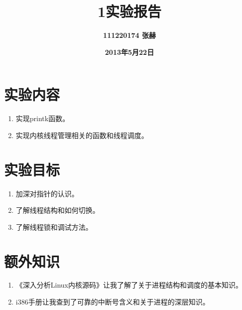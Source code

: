 \documentclass[11pt]{article}
\begin{document}
\title{1实验报告\rm}
\author{\bf111220174 张赫\rm}
\date{\bf 2013年5月22日 \rm}

\maketitle


\section{实验内容}
\begin{enumerate}
  \item 实现printk函数。
 \item 实现内核线程管理相关的函数和线程调度。
\end{enumerate}


\section{实验目标}
\begin{enumerate}
  \item 加深对指针的认识。
  
  \item 了解线程结构和如何切换。
  
  \item 了解线程锁和调试方法。
\end{enumerate}

\section{额外知识}
\begin{enumerate}
 \item 
  《深入分析Linux内核源码》让我了解了关于进程结构和调度的基本知识。
 \item
  i386手册让我查到了可靠的中断号含义和关于进程的深层知识。
\end{enumerate}
\end{document}
